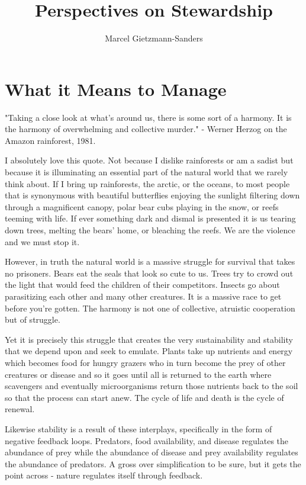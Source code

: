\documentclass[11pt,a5paper]{article}
\title{Perspectives on Stewardship}
\author{Marcel Gietzmann-Sanders}
\date{}
\begin{document}
\maketitle
\tableofcontents
\newpage

\section{What it Means to Manage}

"Taking a close look at what's around us, there is some sort of a harmony. It is the harmony of overwhelming and collective murder." - Werner Herzog on the Amazon rainforest, 1981. \newline

I absolutely love this quote. Not because I dislike rainforests or am a sadist but because it is illuminating an essential part of the natural world that we rarely think about. If I bring up rainforests, the arctic, or the oceans, to most people that is synonymous with beautiful butterflies enjoying the sunlight filtering down through a magnificent canopy, polar bear cubs playing in the snow, or reefs teeming with life. If ever something dark and dismal is presented it is us tearing down trees, melting the bears' home, or bleaching the reefs. We are the violence and we must stop it. 

However, in truth the natural world is a massive struggle for survival that takes no prisoners. Bears eat the seals that look so cute to us. Trees try to crowd out the light that would feed the children of their competitors. Insects go about parasitizing each other and many other creatures. It is a massive race to get before you're gotten. The harmony is not one of collective, atruistic cooperation but of struggle. 

Yet it is precisely this struggle that creates the very sustainability and stability that we depend upon and seek to emulate. Plants take up nutrients and energy which becomes food for hungry grazers who in turn become the prey of other creatures or disease and so it goes until all is returned to the earth where scavengers and eventually microorganisms return those nutrients back to the soil so that the process can start anew. The cycle of life and death is the cycle of renewal. 

Likewise stability is a result of these interplays, specifically in the form of negative feedback loops. Predators, food availability, and disease regulates the abundance of prey while the abundance of disease and prey availability regulates the abundance of predators. A gross over simplification to be sure, but it gets the point across - nature regulates itself through feedback. \newline
\end{document}
